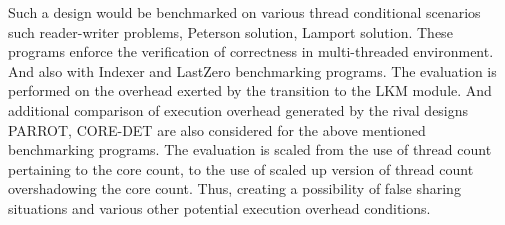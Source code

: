 \documentclass[12pt]{article}
\begin{document}
Such a design would be benchmarked on various thread conditional scenarios such reader-writer problems, Peterson solution, Lamport solution. 
These programs enforce the verification of correctness in multi-threaded environment. 
And also with Indexer and LastZero benchmarking programs. 
The evaluation is performed on the overhead exerted by the transition to the LKM module. 
And additional comparison of execution overhead generated by the rival designs PARROT, CORE-DET are also considered for the above mentioned benchmarking programs. 
The evaluation is scaled from the use of thread count pertaining to the core count, to the use of scaled up version of thread count overshadowing the core count. 
Thus, creating a possibility of false sharing situations and various other potential execution overhead conditions. 
\end{document}
